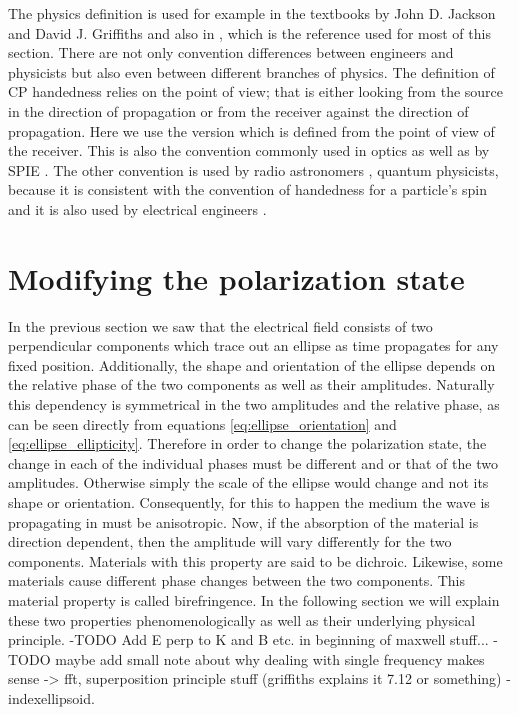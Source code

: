 The physics definition is used for example in the textbooks by John D. Jackson \cite{Jackson1998ClassicalEdition} and David J. Griffiths \cite{Griffiths2017IntroductionElectrodynamics} and also in \cite{Collett2009FieldPolarization}, which is the reference used for most of this section.
There are not only convention differences between engineers and physicists but also even between different branches of physics. The definition of CP handedness relies on the point of view; that is either looking from the source in the direction of propagation or from the receiver against the direction of propagation. Here we use the version which is defined from the point of view of the receiver. This is also the convention commonly used in optics \cite{Bass2016HandbookOptics, M.LandiDeglInnocenti2004PolarizationLines} as well as by SPIE \cite{Collett2009FieldPolarization}.
The other convention is used by radio astronomers \cite{1973CommissionAstronomie}, quantum physicists, because it is consistent with the convention of handedness for a particle's spin and it is also used by electrical engineers \cite{Orfanidis2004ElectromagneticAntennas}.

\section{Modifying the polarization state}
In the previous section we saw that the electrical field consists of two perpendicular components which trace out an ellipse as time propagates for any fixed position. Additionally, the shape and orientation of the ellipse depends on the relative phase of the two components as well as their amplitudes. Naturally this dependency is symmetrical in the two amplitudes and the relative phase, as can be seen directly from equations \ref{eq:ellipse_orientation} and \ref{eq:ellipse_ellipticity}. Therefore in order to change the polarization state, the change in each of the individual phases must be different and or that of the two amplitudes. Otherwise simply the scale of the ellipse would change and not its shape or orientation. Consequently, for this to happen the medium the wave is propagating in must be anisotropic. Now, if the absorption of the material is direction dependent, then the amplitude will vary differently for the two components. Materials with this property are said to be dichroic. Likewise, some materials cause different phase changes between the two components. This material property is called birefringence. In the following section we will explain these two properties phenomenologically as well as their underlying physical principle.
-TODO Add E perp to K and B etc. in beginning of maxwell stuff...
-TODO maybe add small note about why dealing with single frequency makes sense -> fft, superposition principle stuff (griffiths explains it 7.12 or something)
-indexellipsoid.

